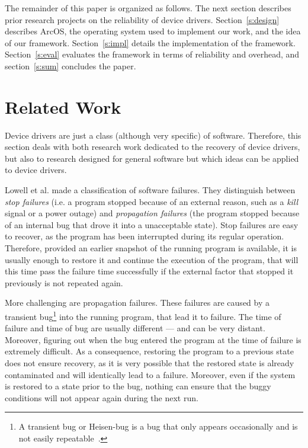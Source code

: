 \documentclass{acm_proc_article-sp}
\begin{document}
The remainder of this paper is organized as follows.  The next section describes prior research projects on the reliability of device drivers.  Section~\ref{s:design} describes ArcOS, the operating system used to implement our work, and the idea of our framework.  Section~\ref{s:impl} details the implementation of the framework.  Section~\ref{s:eval} evaluates the framework in terms of reliability and overhead, and section~\ref{s:sum} concludes the paper.


\section{Related Work}
\label{s:rel}

Device drivers are just a class (although very specific) of software. Therefore, this section deals with both research work dedicated to the recovery of device drivers, but also to research designed for general software but which ideas can be applied to device drivers.

Lowell et al. \cite{Lowell2000} made a classification of software failures. They distinguish between \emph{stop failures} (i.e. a program stopped because of an external reason, such as a \emph{kill} signal or a power outage) and \emph{propagation failures} (the program stopped because of an internal bug that drove it into a unacceptable state). Stop failures are easy to recover, as the program has been interrupted during its regular operation. Therefore, provided an earlier snapshot of the running program is available, it is usually enough to restore it and continue the execution of the program, that will this time pass the failure time successfully if the external factor that stopped it previously is not repeated again.

More challenging are propagation failures. These failures are caused by a transient bug\footnote{A transient bug or Heisen-bug is a bug that only appears occasionally and is not easily repeatable~\cite{Gray1985}.} into the running program, that lead it to failure. The time of failure and time of bug are usually different --- and can be very distant. Moreover, figuring out when the bug entered the program at the time of failure is extremely difficult. As a consequence, restoring the program to a previous state does not ensure recovery, as it is very possible that the restored state is already contaminated and will identically lead to a failure. Moreover, even if the system is restored to a state prior to the bug, nothing can ensure that the buggy conditions will not appear again during the next run.
\end{document}
